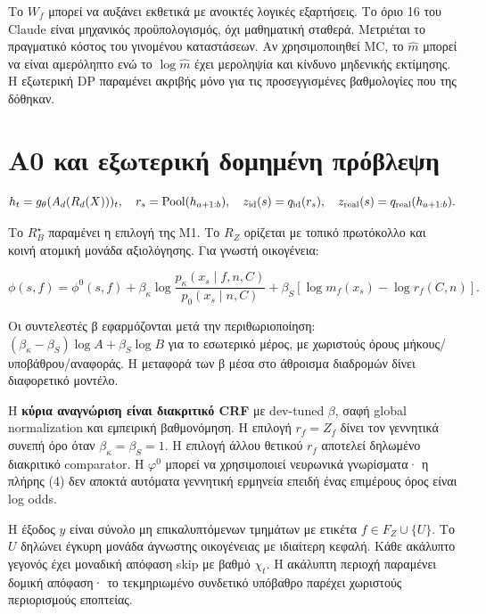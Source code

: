 \documentclass[
  10pt,
  a4paper,
]{report}
\begin{document}
Το \(W_f\) μπορεί να αυξάνει εκθετικά με ανοικτές λογικές εξαρτήσεις. Το
όριο 16 του Claude είναι μηχανικός προϋπολογισμός, όχι μαθηματική
σταθερά. Μετριέται το πραγματικό κόστος του γινομένου καταστάσεων. Αν
χρησιμοποιηθεί MC, το \(\hat m\) μπορεί να είναι αμερόληπτο ενώ το
\(\log\hat m\) έχει μεροληψία και κίνδυνο μηδενικής εκτίμησης. Η
εξωτερική DP παραμένει ακριβής μόνο για τις προσεγγισμένες βαθμολογίες
που της δόθηκαν.

\section{A0 και εξωτερική δομημένη
πρόβλεψη}\label{a0-ux3baux3b1ux3b9-ux3b5ux3beux3c9ux3c4ux3b5ux3c1ux3b9ux3baux3ae-ux3b4ux3bfux3bcux3b7ux3bcux3adux3bdux3b7-ux3c0ux3c1ux3ccux3b2ux3bbux3b5ux3c8ux3b7}

\[
h_t=g_\theta(A_d(R_d(X)))_t,\quad r_s=\mathrm{Pool}(h_{a+1:b}),\quad
z_{\rm id}(s)=q_{\rm id}(r_s),\quad z_{\rm real}(s)=q_{\rm real}(h_{a+1:b}).
\]

Το \(R_B^\star\) παραμένει η επιλογή της M1. Το \(R_Z\) ορίζεται με
τοπικό πρωτόκολλο και κοινή ατομική μονάδα αξιολόγησης. Για γνωστή
οικογένεια:

\[
\phi(s,f)=\phi^0(s,f)+\beta_\kappa\log\frac{p_\kappa(x_s\mid f,n,C)}{p_0(x_s\mid n,C)}
+\beta_S\left[\log m_f(x_s)-\log r_f(C,n)\right].\tag{4}
\]

Οι συντελεστές β εφαρμόζονται μετά την περιθωριοποίηση:
\((\beta_\kappa-\beta_S)\log A+\beta_S\log B\) για το εσωτερικό μέρος,
με χωριστούς όρους μήκους/υποβάθρου/αναφοράς. Η μεταφορά των β μέσα στο
άθροισμα διαδρομών δίνει διαφορετικό μοντέλο.

Η \textbf{κύρια αναγνώριση είναι διακριτικό CRF} με dev-tuned \(\beta\),
σαφή global normalization και εμπειρική βαθμονόμηση. Η επιλογή
\(r_f=Z_f\) δίνει τον γεννητικά συνεπή όρο όταν
\(\beta_\kappa=\beta_S=1\). Η επιλογή άλλου θετικού \(r_f\) αποτελεί
δηλωμένο διακριτικό comparator. Η \(φ^0\) μπορεί να χρησιμοποιεί
νευρωνικά γνωρίσματα· η πλήρης (4) δεν αποκτά αυτόματα γεννητική
ερμηνεία επειδή ένας επιμέρους όρος είναι log odds.

Η έξοδος \(y\) είναι σύνολο μη επικαλυπτόμενων τμημάτων με ετικέτα
\(f\in F_Z\cup\{U\}\). Το \(U\) δηλώνει έγκυρη μονάδα άγνωστης
οικογένειας με ιδιαίτερη κεφαλή. Κάθε ακάλυπτο γεγονός έχει μοναδική
απόφαση skip με βαθμό \(\chi_t\). Η ακάλυπτη περιοχή παραμένει δομική
απόφαση· το τεκμηριωμένο συνδετικό υπόβαθρο παρέχει χωριστούς
περιορισμούς εποπτείας.
\end{document}
